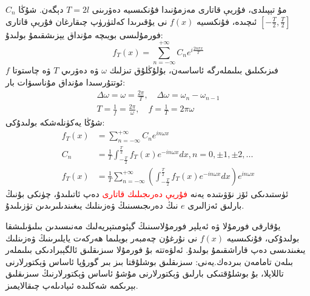 $C_n$
 مۇ تېپىلدى، فۇريې قاتارى مەزمۇنىدا فۇنكىسىيە دەۋرىنى $T=2l$ دېگەن. شۇڭا $\left [-\frac{T}{2},\frac{T}{2}\right ]$ ئىچىدە، فۇنكسىيە $f(x)$ نى يۇقىرىدا كەلتۈرۈپ چىقارغان فۇريې قاتارى فورمۇلىسى بويىچە مۇنداق يېزىشقىمۇ بولىدۇ:
 $$
 f_T(x) = \sum_{n= -\infty}^{+\infty}C_n e^{i \frac{2n \pi x}{T}}
 $$
 فىزىكىلىق بىلىملەرگە ئاساسەن، بۇلۇڭلۇق تىزلىك $\omega$ ۋە دەۋرىي $T$ ۋە چاستوتا $f$ ئوتتۇرسىدا مۇنداق مۇناسىۋات بار:
 \begin{align*}
\Delta \omega = \omega = \frac{2 \pi}{T}, \quad \Delta \omega = \omega_n-\omega_{n-1} \\
T = \frac{1}{f} = \frac{2\pi}{\omega}, \quad f = \frac{1}{T} = 2 \pi \omega
 \end{align*}
شۇڭا يەكۈنلەشكە بولىدۇكى:
\begin{align*}
f_T(x) &= \sum_{n=-\infty}^{+\infty}C_n e^{in \omega x} \\
C_n &= \frac{1}{T} \int_{-\frac{T}{2}}^{\frac{T}{2}} f_T(x)e^{-in \omega x}dx , n=0, \pm 1, \pm 2 , ... \\
f_T(x) &=\frac{1}{T}\sum_{n=-\infty}^{+\infty} \left (\int_{-\frac{T}{2}}^{\frac{T}{2}} f_T(x)e^{-in \omega x}dx \right)e^{in \omega x}
\end{align*}
ئۈستىدىكى ئۆز نۆۋىتىدە يەنە 
\textcolor{red}{فۇريې دەرىجىلىك قاتارى}
دەپ ئاتىلىدۇ، چۈنكى بۇنىڭ بارلىق ئەزالىرى $e$ نىڭ دەرىجىسىنىڭ ۋەزىنلىك يىغىندىلىرىدىن تۈزىلىدۇ.

\begin{colorful}[cyan]
يۇقارقى فورمۇلا ۋە ئەيلېر فورمۇلاسىنىڭ گېئومىتېريەلىك مەنىسىدىن بىلىۋىلىشقا بولىدۇكى، فۇنكىسىيە $f(x)$ نى نۇرغۇن چەمبەر بويلىما ھەركەت يايلىرىنىڭ ۋەزىنلىك يىغىندىسى دەپ قاراشقىمۇ بولىدۇ.
ئەلۋەتتە بۇ فورمۇلا سىزىقلىق ئالگېبرادىكى بىلىملەر بىلەن تامامەن بىردەك.يەنى: سىزىقلىق بوشلۇقتا بىز بىر گورۇپا ئاساس ۋېكتورلارنى تاللاپلا، بۇ بوشلۇقتىكى بارلىق ۋېكتورلارنى مۇشۇ ئاساس ۋېكتورلارنىڭ سىزىقلىق بېرىكمە شەكلىدە ئىپادىلەپ چىقالايمىز.
\end{colorful}
 
